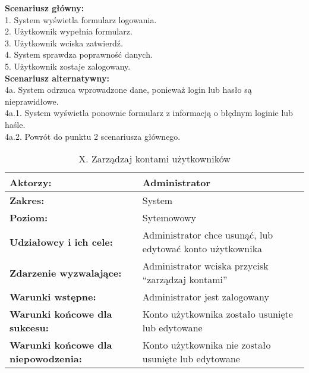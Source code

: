 \textbf{Scenariusz główny:}\\
1. System wyświetla formularz logowania.\\
2. Użytkownik wypełnia formularz.\\
3. Użytkownik wciska zatwierdź.\\
4. System sprawdza poprawność danych.\\
5. Użytkownik zostaje zalogowany.\\
\textbf{Scenariusz alternatywny:}\\
4a. System odrzuca wprowadzone dane, ponieważ login lub hasło są nieprawidłowe.\\
4a.1. System wyświetla ponownie formularz z informacją o błędnym loginie lub haśle.\\
4a.2. Powrót do punktu 2 scenariusza głównego.\\
\newpage
	\begin{table}[H]
\centering
\caption{X. Zarządzaj kontami użytkowników}
\label{zku}
\begin{tabular}{|p{7cm}|p{7cm}|}
  \hline 
  \textbf{Aktorzy:} & Administrator\\
  \hline
  \textbf{Zakres:} & System \\
	\hline
  \textbf{Poziom:} & Sytemowowy \\
	\hline
  \textbf{Udziałowcy i ich cele: } & Administrator chce usunąć, lub edytować konto użytkownika
 \\
	\hline
  \textbf{Zdarzenie wyzwalające: } & Administrator wciska przycisk “zarządzaj kontami”
\\
	\hline
  \textbf{Warunki wstępne: } & Administrator jest zalogowany \\
	\hline
  \textbf{Warunki końcowe dla sukcesu:} & Konto użytkownika zostało usunięte lub edytowane\\
	\hline
  \textbf{Warunki końcowe dla niepowodzenia:} &  Konto użytkownika nie zostało usunięte lub edytowane \\
  \hline
\end{tabular} 
\end{table}

